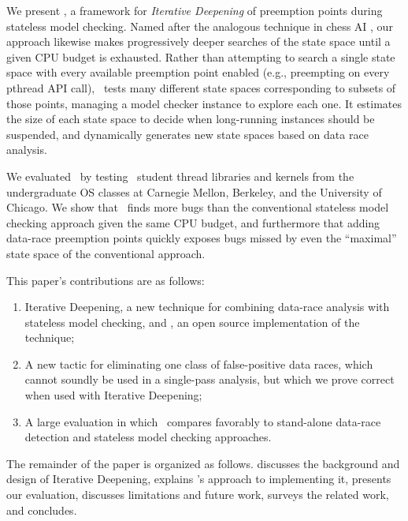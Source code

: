 
We present \quicksand, a framework for {\em Iterative Deepening} of preemption points during stateless model checking.
Named after the analogous technique in chess AI \cite{iterative-deepening-chess-ai}, our approach likewise makes progressively deeper searches of the state space until a given CPU budget is exhausted.
Rather than attempting to search a single state space with every available preemption point enabled (e.g., preempting on every pthread API call),
\quicksand~tests many different state spaces corresponding to subsets of those points, managing a model checker instance to explore each one.
It estimates the size of each state space to decide when long-running instances should be suspended, and dynamically generates new state spaces based on data race analysis.

We evaluated \quicksand~by testing \numstudence~student thread libraries and kernels from the undergraduate OS classes at Carnegie Mellon, Berkeley, and the University of Chicago.
We show that \quicksand~finds more bugs than the conventional stateless model checking approach given the same CPU budget,
and furthermore that adding data-race preemption points quickly exposes bugs missed by even the ``maximal'' state space of the conventional approach.

This paper's contributions are as follows:
\begin{enumerate}
	\item Iterative Deepening, a new technique for combining data-race analysis with stateless model checking, and \quicksand, an open source implementation of the technique;
	\item A new tactic for eliminating one class of false-positive data races,
		which cannot soundly be used in a single-pass analysis,
		but which we prove correct when used with Iterative Deepening;
	\item A large evaluation in which \quicksand~compares favorably to stand-alone data-race detection and stateless model checking approaches.
\end{enumerate}

The remainder of the paper is organized as follows.
\sect{\ref{sec:design}} discusses the background and design of Iterative Deepening,
\sect{\ref{sec:implementation}} explains \quicksand's approach to implementing it,
\sect{\ref{sec:eval}} presents our evaluation,
\sect{\ref{sec:future}} discusses limitations and future work,
\sect{\ref{sec:related}} surveys the related work,
and \sect{\ref{sec:conclusion}} concludes.
